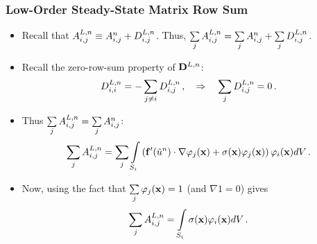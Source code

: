 \begin{frame}
\frametitle{Low-Order Steady-State Matrix Row Sum}

\begin{itemize}
  \item Recall that $A_{i,j}^{L,n}\equiv A_{i,j}^{n}
    +D_{i,j}^{L,n}$. Thus,
      $\sum\limits_jA_{i,j}^{L,n} = \sum\limits_jA_{i,j}^{n}
      +\sum\limits_jD_{i,j}^{L,n} \,.$
  \item Recall the zero-row-sum property of $\diffusionmatrix^{L,n}$:
    \begin{equation}
      D_{i,i}^{L,n} =
        -\sum_{j\ne i}D_{i,j}^{L,n}
      \,, \quad \Rightarrow \quad
        \sum\limits_jD_{i,j}^{L,n} = 0 \,.
    \end{equation}
  \item Thus $\sum\limits_jA^{L,n}_{i,j} =
   \sum\limits_j A^{n}_{i,j}$:
\begin{equation}
  \sum\limits_jA^{L,n}_{i,j} = \sum\limits_j \int\limits_{S_i}
    \left(\mathbf{f}'(\tilde{u}^n)
      \cdot\nabla\varphi_j(\mathbf{x}) +
      \sigma(\mathbf{x})\varphi_j(\mathbf{x})\right)\varphi_i(\mathbf{x}) dV \,.
\end{equation}
  \item Now, using the fact that $\sum\limits_j\varphi_j(\mathbf{x})=1$
    (and $\nabla 1 = 0$) gives
    \begin{equation}
      \sum\limits_jA^{L,n}_{i,j} =
        \int\limits_{S_i}\sigma(\mathbf{x})\varphi_i(\mathbf{x}) dV \,.
    \end{equation}
\end{itemize}

\end{frame}

